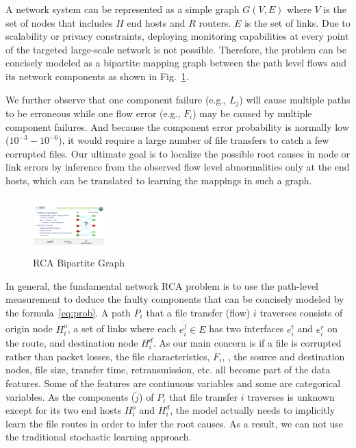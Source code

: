 A network system can be represented as a simple graph $G(V,E)$ where $V$ is the set of nodes that includes $H$ end hosts and $R$ routers. $E$ is the set of links. 
Due to scalability or privacy constraints, deploying monitoring capabilities at every point of the targeted large-scale network is not possible. Therefore, the problem can be concisely modeled as a bipartite mapping graph between the path level flows and its network components as shown in Fig.~\ref{fig:bipartite}. 

We further observe that one component failure (e.g., $L_j$) will cause multiple paths to be erroneous while one flow error (e.g., $F_i$) may be caused by multiple component failures. And because the component error probability is normally low ($10^{-3} - 10^{-6}$), it would require a large number of file transfers to catch a few corrupted files. Our ultimate goal is to localize the possible root causes in node or link errors by inference from the observed flow level abnormalities only at the end hosts, which can be translated to learning the mappings in such a graph.

\begin{figure}
  \begin{center}
    \includegraphics[width=0.25\textwidth]{./figure/RCABipartite}
  \end{center}
  \vspace{-5pt}
\caption{RCA Bipartite Graph}
\vspace{-5pt}
\label{fig:bipartite}
\end{figure}

In general, the fundamental network RCA problem is to use the path-level measurement to deduce the faulty components that can be concisely modeled by the formula~\ref{eq:prob}.
A path $P_i$ that a file transfer (flow) $i$ traverses consists of origin node $H_i^o$, a set of links where each $e_i^{\tilde{j}}\in E$ has two interfaces $e_i^t$ and $e_i^r$ on the route, and destination node $H_i^d$. 
As our main concern is if a file is corrupted rather than packet losses, the file characteristics, $F_i$, \eg, the source and destination nodes, file size, transfer time, retransmission, etc. all become part of the data features. 
Some of the features are continuous variables and some are categorical variables.
As the components ($\tilde{j}$) of $P_i$ that file transfer $i$ traverses is unknown except for its two end hosts $H_i^o$ and $H_i^d$, the model actually needs to implicitly learn the file routes in order to infer the root causes.   
As a result, we can not use the traditional stochastic learning approach.

